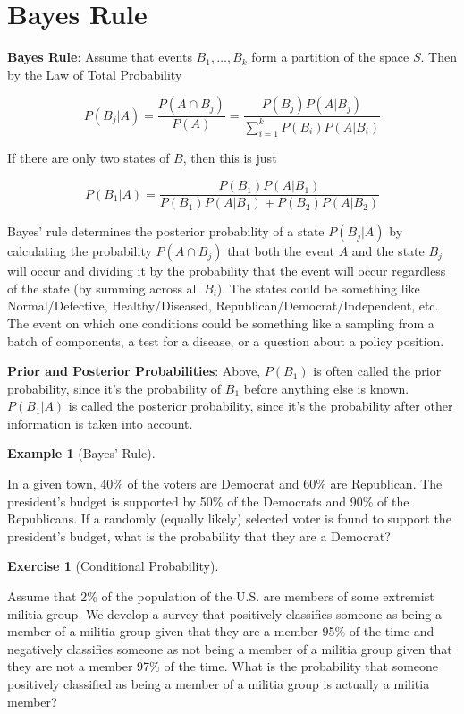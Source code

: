 \documentclass[
  letterpaper,
]{book}
\theoremstyle{definition}
\theoremstyle{definition}
\newtheorem{example}{Example}[chapter]
\theoremstyle{plain}
\theoremstyle{definition}
\newtheorem{exercise}{Exercise}[chapter]
\theoremstyle{plain}
\theoremstyle{plain}
\theoremstyle{remark}
\begin{document}
\hypertarget{bayes-rule}{%
\section{Bayes Rule}\label{bayes-rule}}

\textbf{Bayes Rule}: Assume that events \(B_1,\ldots,B_k\) form a
partition of the space \(S\). Then by the Law of Total Probability

\[P(B_j|A)= \frac{P(A \cap B_j)} {P(A)} = \frac{P(B_j) P(A|B_j)}{\sum\limits_{i=1}^k P(B_i)P(A|B_i)}\]

If there are only two states of \(B\), then this is just

\[P(B_1|A)=\frac{P(B_1)P(A|B_1)} {P(B_1)P(A|B_1)+P(B_2)P(A|B_2)}\]

Bayes' rule determines the posterior probability of a state \(P(B_j|A)\)
by calculating the probability \(P(A \cap B_j)\) that both the event
\(A\) and the state \(B_j\) will occur and dividing it by the
probability that the event will occur regardless of the state (by
summing across all \(B_i\)). The states could be something like
Normal/Defective, Healthy/Diseased, Republican/Democrat/Independent,
etc. The event on which one conditions could be something like a
sampling from a batch of components, a test for a disease, or a question
about a policy position.

\textbf{Prior and Posterior Probabilities}: Above, \(P(B_1)\) is often
called the prior probability, since it's the probability of \(B_1\)
before anything else is known. \(P(B_1|A)\) is called the posterior
probability, since it's the probability after other information is taken
into account.

\leavevmode{}%
\begin{example}[Bayes' Rule]\label{exm-bayesrule}

In a given town, 40\% of the voters are Democrat and 60\% are
Republican. The president's budget is supported by 50\% of the Democrats
and 90\% of the Republicans. If a randomly (equally likely) selected
voter is found to support the president's budget, what is the
probability that they are a Democrat?

\end{example}

\leavevmode{}%
\begin{exercise}[Conditional Probability]\label{exr-condprobexr}

Assume that 2\% of the population of the U.S. are members of some
extremist militia group. We develop a survey that positively classifies
someone as being a member of a militia group given that they are a
member 95\% of the time and negatively classifies someone as not being a
member of a militia group given that they are not a member 97\% of the
time. What is the probability that someone positively classified as
being a member of a militia group is actually a militia member?

\end{exercise}
\end{document}
